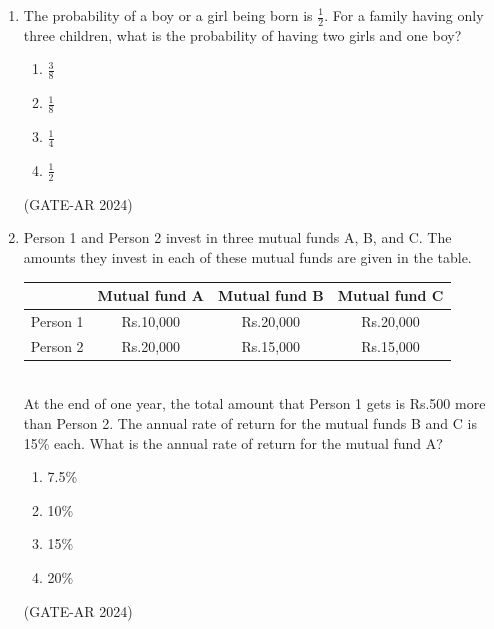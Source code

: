\documentclass[a4paper,10pt]{article}
\begin{document}
\begin{enumerate}
    \item The probability of a boy or a girl being born is $\frac{1}{2}$. For a family having only three children, what is the probability of having two girls and one boy?
    \begin{multicols}{4}
    \begin{enumerate}
        \item $\frac{3}{8}$
        \item $\frac{1}{8}$
        \item $\frac{1}{4}$
        \item $\frac{1}{2}$
    \end{enumerate}
    \end{multicols}
    \hfill (GATE-AR 2024)

    \item Person 1 and Person 2 invest in three mutual funds A, B, and C. The amounts they invest in each of these mutual funds are given in the table. \\
    \begin{tabular}{ | c | c | c | c | }
    \hline
    & Mutual fund A & Mutual fund B & Mutual fund C \\
    \hline
    Person 1 & Rs.10,000 & Rs.20,000 & Rs.20,000 \\
    \hline
    Person 2 & Rs.20,000 & Rs.15,000 & Rs.15,000 \\
    \hline
    \end{tabular} \\
    At the end of one year, the total amount that Person 1 gets is Rs.500 more than Person 2. The annual rate of return for the mutual funds B and C is 15\% each. What is the annual rate of return for the mutual fund A?
    \begin{multicols}{4}
    \begin{enumerate}
        \item 7.5\%
        \item 10\%
        \item 15\%
        \item 20\%
    \end{enumerate}
    \end{multicols}
    \hfill (GATE-AR 2024)

\newpage


\end{enumerate}
\end{document}
